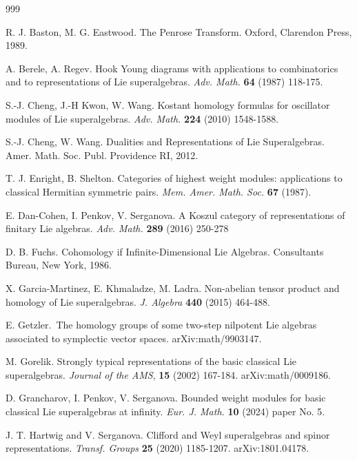 \documentclass[12pt, reqno]{article}
\theoremstyle{definition}
\theoremstyle{remark}
\numberwithin{itemcounter}{section}
\numberwithin{equation}{section}
\begin{document}
 
 \vfill\eject
\begin{thebibliography}{999}

  R. J. Baston, M. G. Eastwood. The Penrose Transform. Oxford, Clarendon Press, 1989. 

 A. Berele, A. Regev. 
Hook Young diagrams  with applications to combinatorics and to
representations of Lie superalgebras. {\em Adv. Math.} 
{\bf 64} (1987) 118-175. 

 S.-J. Cheng, J.-H Kwon, W. Wang.
Kostant homology formulas for oscillator modules of Lie superalgebras.
{\em Adv. Math.} {\bf 224} (2010) 1548-1588. 

S.-J. Cheng,  W. Wang.  Dualities and Representations of Lie Superalgebras.  Amer. Math. Soc.  
Publ. Providence RI, 2012.

 T. J. Enright, B. Shelton. Categories of highest weight modules:
applications to classical Hermitian symmetric pairs. {\em Mem. Amer. Math. Soc.} 
{\bf 67} (1987).

 E. Dan-Cohen, I. Penkov, V. Serganova. A Koszul category of representations of finitary Lie algebras.
  {\em Adv. Math.} {\bf 289} (2016) 250-278

 D. B. Fuchs. Cohomology if Infinite-Dimensional Lie Algebras. 
Consultants Bureau, New York, 1986.   %

 X. Garcia-Martinez, E. Khmaladze, M. Ladra. Non-abelian tensor product and homology of
Lie superalgebras. {\em J.  Algebra} {\bf 440} (2015) 464-488. 

 E. Getzler. The homology groups of some two-step nilpotent Lie algebras associated to symplectic vector spaces. arXiv:math/9903147. 

  M. Gorelik. Strongly typical representations
 of the basic classical Lie superalgebras.
 {\em Journal of the AMS}, {\bf 15} (2002) 167-184.
 arXiv:math/0009186. 
 
  D. Grancharov, I. Penkov, V. Serganova. Bounded weight modules for basic classical Lie superalgebras at infinity. {\em Eur. J. Math.} {\bf 10} (2024) paper No. 5. 
 
  J.  T. Hartwig and V. Serganova. 
 Clifford and Weyl superalgebras and spinor representations. 
 {\em Transf. Groups} {\bf 25} (2020) 1185-1207. 
 arXiv:1801.04178.  
 

\end{thebibliography}
\end{document}
